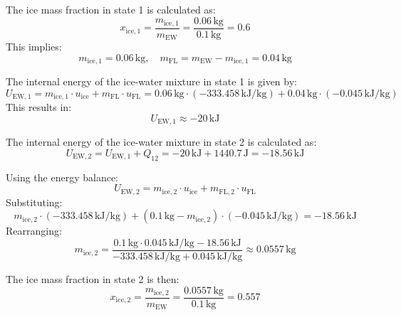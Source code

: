 The ice mass fraction in state 1 is calculated as:  
\[
x_{\text{ice},1} = \frac{m_{\text{ice},1}}{m_{\text{EW}}} = \frac{0.06 \, \text{kg}}{0.1 \, \text{kg}} = 0.6
\]  
This implies:  
\[
m_{\text{ice},1} = 0.06 \, \text{kg}, \quad m_{\text{FL}} = m_{\text{EW}} - m_{\text{ice},1} = 0.04 \, \text{kg}
\]  

The internal energy of the ice-water mixture in state 1 is given by:  
\[
U_{\text{EW},1} = m_{\text{ice},1} \cdot u_{\text{ice}} + m_{\text{FL}} \cdot u_{\text{FL}} = 0.06 \, \text{kg} \cdot (-333.458 \, \text{kJ/kg}) + 0.04 \, \text{kg} \cdot (-0.045 \, \text{kJ/kg})
\]  
This results in:  
\[
U_{\text{EW},1} \approx -20 \, \text{kJ}
\]  

The internal energy of the ice-water mixture in state 2 is calculated as:  
\[
U_{\text{EW},2} = U_{\text{EW},1} + Q_{12} = -20 \, \text{kJ} + 1440.7 \, \text{J} = -18.56 \, \text{kJ}
\]  

Using the energy balance:  
\[
U_{\text{EW},2} = m_{\text{ice},2} \cdot u_{\text{ice}} + m_{\text{FL},2} \cdot u_{\text{FL}}
\]  
Substituting:  
\[
m_{\text{ice},2} \cdot (-333.458 \, \text{kJ/kg}) + (0.1 \, \text{kg} - m_{\text{ice},2}) \cdot (-0.045 \, \text{kJ/kg}) = -18.56 \, \text{kJ}
\]  
Rearranging:  
\[
m_{\text{ice},2} = \frac{0.1 \, \text{kg} \cdot 0.045 \, \text{kJ/kg} - 18.56 \, \text{kJ}}{-333.458 \, \text{kJ/kg} + 0.045 \, \text{kJ/kg}} \approx 0.0557 \, \text{kg}
\]  

The ice mass fraction in state 2 is then:  
\[
x_{\text{ice},2} = \frac{m_{\text{ice},2}}{m_{\text{EW}}} = \frac{0.0557 \, \text{kg}}{0.1 \, \text{kg}} = 0.557
\]